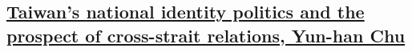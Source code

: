 \documentclass[a4paper,10pt]{article}
\begin{document}
\subsection*{\href{http://isites.harvard.edu/fs/docs/icb.topic199080.files/Readings_for_October_23_/Chu.AS.04.pdf}{Taiwan’s national identity politics and the prospect of cross-strait relations, Yun-han Chu}}

%
%
%
%
%
%
%
%
%
%
%
%
%
\end{document}
